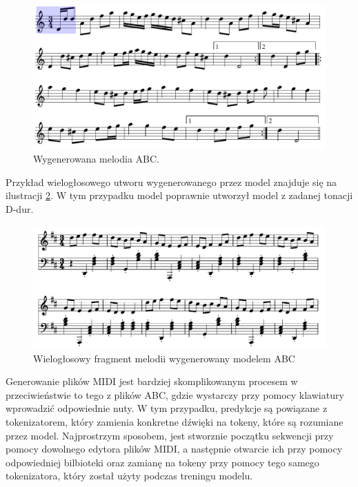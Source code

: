 \documentclass[data-science]{agh-wi} %
\begin{document}
\begin{figure}[ht!]
    \begin{center}
        \includegraphics[width=0.9\linewidth]{./img/abc_gen_nice1.pdf}
    \end{center}
    \caption{Wygenerowana melodia ABC.}\label{fig:music_gen1}
\end{figure}

Przykład wielogłosowego utworu wygenerowanego przez model znajduje się na ilustracji \ref*{fig:vvv_abc}. W tym przypadku model poprawnie utworzył model z zadanej tonacji D-dur.

\begin{figure}[ht!]
    \centering
    \includegraphics[width=0.9\linewidth]{./img/example.pdf}
    \caption{Wielogłosowy fragment melodii wygenerowany modelem ABC}\label{fig:vvv_abc}
\end{figure}

Generowanie plików MIDI jest bardziej skomplikowanym procesem w przeciwieństwie to tego z plików ABC, gdzie wystarczy przy pomocy klawiatury wprowadzić odpowiednie nuty. W tym przypadku, predykcje są powiązane z tokenizatorem, który zamienia konkretne dźwięki na tokeny, które są rozumiane przez model. Najprostrzym sposobem, jest stworznie początku sekwencji przy pomocy dowolnego edytora plików MIDI, a następnie otwarcie ich przy pomocy odpowiedniej bilbioteki oraz zamianę na tokeny przy pomocy tego samego tokenizatora, który został użyty podczas treningu modelu.
\end{document}
